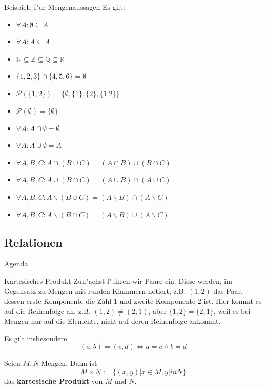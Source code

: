 \documentclass{beamer}
\begin{document}
\begin{frame}{Beispiele f"ur Mengenaussagen}
Es gilt:
\begin{itemize}
  \item $\forall A:\emptyset\subseteq A$
  \item $\forall A:A\subseteq A$
  \item $\mathbb{N}\subseteq\mathbb{Z}\subseteq\mathbb{Q}\subseteq\mathbb{R}$
  \item $\{1,2,3\}\cap\{4,5,6\}=\emptyset$
  \item $\mathscr{P}(\{1,2\})=\{\emptyset,\{1\},\{2\},\{1.2\}\}$
  \item $\mathscr{P}(\emptyset)=\{\emptyset\}$
  \item $\forall A: A\cap\emptyset=\emptyset$
  \item $\forall A:A\cup\emptyset=A$
  \item $\forall A,B,C: A\cap(B\cup C)=(A\cap B)\cup (B\cap C)$
  \item $\forall A,B,C: A\cup (B\cap C)=(A\cup B)\cap (A\cup C)$
  \item $\forall A,B,C: A\backslash(B\cup C)=(A\backslash B)\cap (A\backslash C)$
  \item $\forall A,B,C: A\backslash(B\cap C)=(A\backslash B)\cup (A\backslash C)$
\end{itemize}

\end{frame}
\subsection{Relationen}
\begin{frame}{Agenda}
   
    
  \tableofcontents[currentsection]
  \end{frame}
\begin{frame}{Kartesisches Produkt}
  Zun"achst f"uhren wir Paare ein. Diese werden, im Gegensatz zu Mengen mit runden Klammern notiert, z.B.
  $(1,2)$ das Paar, dessen erste Komponente die Zahl $1$ und zweite Komponente $2$ ist. Hier kommt es auf die Reihenfolge an, z.B. $(1,2)\neq(2,1)$, aber $\{1,2\}=\{2,1\}$, weil 
  es bei Mengen nur auf die Elemente, nicht auf deren Reihenfolge ankommt.
  
  Es gilt insbesondere \[(a,b)=(c,d)\Leftrightarrow a=c\wedge b=d\]
  \begin{definition}
    Seien $M,N$ Mengen. Dann ist \[M\times N:=\{(x,y)|x\in M,y|in N\}\] das \textbf{kartesische Produkt} von $M$ und $N$.
  \end{definition}
  
\end{frame}
\end{document}

